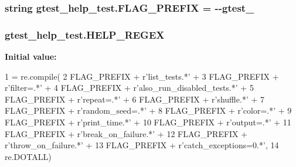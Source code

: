 \subsubsection[{\texorpdfstring{F\+L\+A\+G\+\_\+\+P\+R\+E\+F\+IX}{FLAG_PREFIX}}]{\setlength{\rightskip}{0pt plus 5cm}string gtest\+\_\+help\+\_\+test.\+F\+L\+A\+G\+\_\+\+P\+R\+E\+F\+IX = \textquotesingle{}-\/-\/gtest\+\_\+\textquotesingle{}}\hypertarget{namespacegtest__help__test_a9e357a76dd993057c826ec411c9a4b3c}{}\label{namespacegtest__help__test_a9e357a76dd993057c826ec411c9a4b3c}
\subsubsection[{\texorpdfstring{H\+E\+L\+P\+\_\+\+R\+E\+G\+EX}{HELP_REGEX}}]{\setlength{\rightskip}{0pt plus 5cm}gtest\+\_\+help\+\_\+test.\+H\+E\+L\+P\+\_\+\+R\+E\+G\+EX}\hypertarget{namespacegtest__help__test_acaee97106f5b6ad6de66778688d4b906}{}\label{namespacegtest__help__test_acaee97106f5b6ad6de66778688d4b906}
{\bfseries Initial value\+:}
\begin{DoxyCode}
1 = re.compile(
2     FLAG\_PREFIX + \textcolor{stringliteral}{r'list\_tests.*'} +
3     FLAG\_PREFIX + \textcolor{stringliteral}{r'filter=.*'} +
4     FLAG\_PREFIX + \textcolor{stringliteral}{r'also\_run\_disabled\_tests.*'} +
5     FLAG\_PREFIX + \textcolor{stringliteral}{r'repeat=.*'} +
6     FLAG\_PREFIX + \textcolor{stringliteral}{r'shuffle.*'} +
7     FLAG\_PREFIX + \textcolor{stringliteral}{r'random\_seed=.*'} +
8     FLAG\_PREFIX + \textcolor{stringliteral}{r'color=.*'} +
9     FLAG\_PREFIX + \textcolor{stringliteral}{r'print\_time.*'} +
10     FLAG\_PREFIX + \textcolor{stringliteral}{r'output=.*'} +
11     FLAG\_PREFIX + \textcolor{stringliteral}{r'break\_on\_failure.*'} +
12     FLAG\_PREFIX + \textcolor{stringliteral}{r'throw\_on\_failure.*'} +
13     FLAG\_PREFIX + \textcolor{stringliteral}{r'catch\_exceptions=0.*'},
14     re.DOTALL)
\end{DoxyCode}
